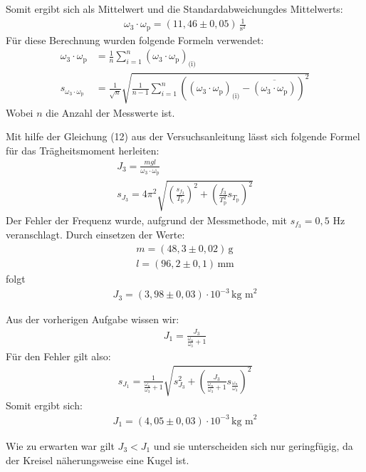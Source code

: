 Somit ergibt sich als Mittelwert und die Standardabweichungdes Mittelwerts: 
\begin{align}
    \omega_3 \cdot \omega_\text{p} = (11,46 \pm 0,05) \, \frac{1}{\text{s}^2}
\end{align}
Für diese Berechnung wurden folgende Formeln verwendet:
\begin{align}
    \omega_3 \cdot \omega_\text{p} &= \frac{1}{n}\sum_{i=1}^n (\omega_3 \cdot \omega_\text{p})_\text{(i)}\\
    s_{\omega_3 \cdot \omega_\text{p}} &= \frac{1}{\sqrt{n}} \sqrt{\frac{1}{n-1}\sum_{i=1}^n((\omega_3 \cdot \omega_\text{p})_\text{(i)} - \overline{(\omega_3 \cdot \omega_\text{p})})^2}
\end{align}
Wobei \(n\) die Anzahl der Messwerte ist.



Mit hilfe der Gleichung (12) aus der Versuchsanleitung lässt sich folgende Formel für das Trägheitsmoment herleiten:
\begin{align}
    J_3 = \frac{mgl}{\omega_3 \cdot \omega_\text{p}}\\
    s_{J_3} = 4\pi^2 \sqrt{(\frac{s_{f_3}}{T_\text{p}})^2 + (\frac{f_3}{T_\text{p}^2} s_{T_\text{p}})^2}
\end{align}
Der Fehler der Frequenz wurde, aufgrund der Messmethode, mit \(s_{f_3} = 0,5\) Hz veranschlagt.
Durch einsetzen der Werte:
\begin{align}
    m = (48,3 \pm 0,02)\, \text{g}\\
    l = (96,2 \pm 0,1)\, \text{mm}
\end{align}
folgt
\begin{align}
    J_3 = (3,98 \pm 0,03) \cdot 10^{-3} \, \text{kg m}^2
\end{align}

Aus der vorherigen Aufgabe wissen wir:
\begin{align}
    J_1 = \frac{J_3}{\frac{\omega_\text{n}}{\omega_3}+1}
\end{align}
Für den Fehler gilt also:
\begin{align}
    s_{J_1} = \frac{1}{\frac{\omega_\text{n}}{\omega_3}+1} \sqrt{s_{J_3}^2 + (\frac{J_3}{\frac{\omega_n}{\omega_3}+1} s_{\frac{\omega_n}{\omega_3}})^2}
\end{align}
Somit ergibt sich:
\begin{align}
    J_1 = (4,05 \pm 0,03)\cdot 10^{-3} \, \text{kg m}^2
\end{align}

Wie zu erwarten war gilt \(J_3 < J_1\) und sie unterscheiden sich nur geringfügig, da der Kreisel näherungsweise eine Kugel ist.


